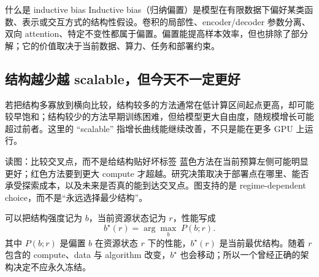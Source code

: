 

\begin{importantbox}{什么是 inductive bias}
Inductive bias（归纳偏置）是模型在有限数据下偏好某类函数、表示或交互方式的结构性假设。卷积的局部性、encoder/decoder 参数分离、双向 attention、特定不变性都属于偏置。偏置能提高样本效率，但也排除了部分解；它的价值取决于当前数据、算力、任务和部署约束。
\end{importantbox}


\subsection{结构越少越 scalable，但今天不一定更好}

若把结构多寡放到横向比较，结构较多的方法通常在低计算区间起点更高，却可能较早饱和；结构较少的方法早期训练困难，但给模型更大自由度，随规模增长可能超过前者。这里的 ``scalable'' 指增长曲线能继续改善，不只是能在更多 GPU 上运行。


\begin{knowledgebox}{读图：比较交叉点，而不是给结构贴好坏标签}
蓝色方法在当前预算左侧可能明显更好；红色方法要到更大 compute 才超越。研究决策取决于部署点在哪里、能否承受探索成本，以及未来是否真的能到达交叉点。图支持的是 regime-dependent choice，而不是“永远选择最少结构”。
\end{knowledgebox}



可以把结构强度记为 $b$，当前资源状态记为 $r$，性能写成
\[
b^{\star}(r)=\arg\max_b\; P(b;r).
\]
其中 $P(b;r)$ 是偏置 $b$ 在资源状态 $r$ 下的性能，$b^{\star}(r)$ 是当前最优结构。随着 $r$ 包含的 compute、data 与 algorithm 改变，$b^{\star}$ 也会移动；所以一个曾经正确的架构决定不应永久冻结。

